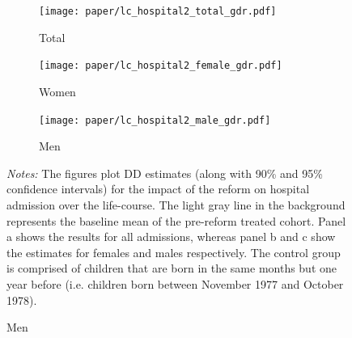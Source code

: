 \documentclass[11pt, a4paper]{article} %
\begin{document}
\newpage
\vspace*{\fill}
\begin{figure}[H]\centering
	\caption{Life-course approach for hospital admission}\label{fig: lc_hospital2_gdr_DD}
	\begin{subfigure}[h]{0.48\linewidth}\centering\caption{Total}
		\texttt{[image: paper/lc\_hospital2\_total\_gdr.pdf]}
	\end{subfigure}
	
	
	\begin{subfigure}[h]{0.48\linewidth}\centering\caption{Women}
		\texttt{[image: paper/lc\_hospital2\_female\_gdr.pdf]}
	\end{subfigure}
	\quad
	\begin{subfigure}[h]{0.48\linewidth}\centering\caption{Men}
		\texttt{[image: paper/lc\_hospital2\_male\_gdr.pdf]}
	\end{subfigure}
	\scriptsize
	\begin{minipage}{\linewidth}
		\emph{Notes:} The figures plot DD estimates (along with 90\% and 95\% confidence intervals) for the impact of the reform on hospital admission over the life-course. The light gray line in the background represents the baseline mean of the pre-reform treated cohort. Panel a shows the results for all admissions, whereas panel b and c show the estimates for females and males respectively. The control group is comprised of children	that are born in the same months but one year before (i.e. children born between November 1977 and October 1978).
	\end{minipage}
\end{figure}
\vspace*{\fill}\clearpage
\vspace*{\fill}
\end{document}
